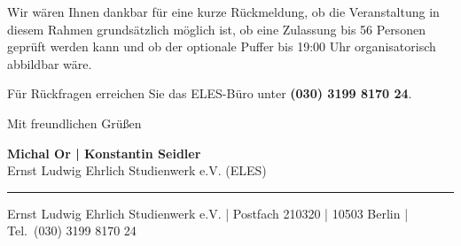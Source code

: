 \documentclass[11pt,a4paper]{article}
\newcommand{\InvitingOrg}{Ernst Ludwig Ehrlich Studienwerk e.V. (ELES)}
\newcommand{\ContactNames}{Michal Or | Konstantin Seidler}
\newcommand{\ContactPhone}{(030) 3199 8170 24}
\newcommand{\OfficeAddress}{Ernst Ludwig Ehrlich Studienwerk e.V. | Postfach 210320 | 10503 Berlin}
\begin{document}
\normalsize

\enlargethispage{5\baselineskip}

Wir w\"aren Ihnen dankbar f\"ur eine kurze R\"uckmeldung, ob die Veranstaltung in diesem Rahmen grunds\"atzlich m\"oglich ist, ob eine Zulassung bis 56 Personen gepr\"uft werden kann und ob der optionale Puffer bis 19:00 Uhr organisatorisch abbildbar w\"are.

F\"ur R\"uckfragen erreichen Sie das ELES-B\"uro unter \textbf{\ContactPhone}.

\vspace{4pt}

Mit freundlichen Gr\"u{\ss}en

\vspace{8pt}

\textbf{\ContactNames}\\
\InvitingOrg

\vspace{8pt}
\hrule
\vspace{4pt}
\small
\OfficeAddress{} | Tel.\ \ContactPhone
\end{document}
